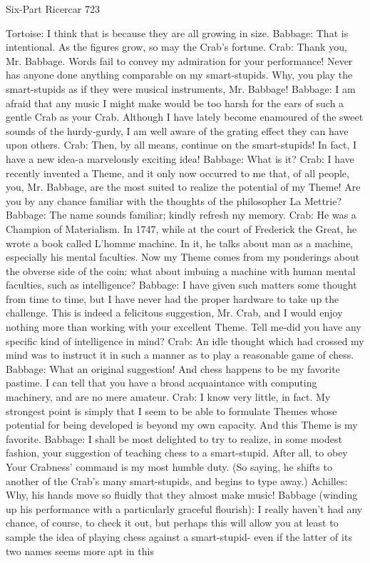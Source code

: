 Six-Part Ricercar                                                                       723

Tortoise: I think that is because they are all growing in size.
Babbage: That is intentional. As the figures grow, so may the Crab's fortune.
Crab: Thank you, Mr. Babbage. Words fail to convey my admiration for your
  performance! Never has anyone done anything comparable on my smart-stupids. Why,
  you play the smart-stupids as if they were musical instruments, Mr. Babbage!
Babbage: I am afraid that any music I might make would be too harsh for the ears of such
  a gentle Crab as your Crab. Although I have lately become enamoured of the sweet
  sounds of the hurdy-gurdy, I am well aware of the grating effect they can have upon
  others.
Crab: Then, by all means, continue on the smart-stupids! In fact, I have a new idea-a
  marvelously exciting idea!
Babbage: What is it?
Crab: I have recently invented a Theme, and it only now occurred to me that, of all
  people, you, Mr. Babbage, are the most suited to realize the potential of my Theme!
  Are you by any chance familiar with the thoughts of the philosopher La Mettrie?
Babbage: The name sounds familiar; kindly refresh my memory.
Crab: He was a Champion of Materialism. In 1747, while at the court of Frederick the
  Great, he wrote a book called L'homme machine. In it, he talks about man as a
  machine, especially his mental faculties. Now my Theme comes from my ponderings
  about the obverse side of the coin: what about imbuing a machine with human mental
  faculties, such as intelligence?
Babbage: I have given such matters some thought from time to time, but I have never had
  the proper hardware to take up the challenge. This is indeed a felicitous suggestion,
  Mr. Crab, and I would enjoy nothing more than working with your excellent Theme.
  Tell me-did you have any specific kind of intelligence in mind?
Crab: An idle thought which had crossed my mind was to instruct it in such a manner as
  to play a reasonable game of chess.
Babbage: What an original suggestion! And chess happens to be my favorite pastime. I
  can tell that you have a broad acquaintance with computing machinery, and are no
  mere amateur.
Crab: I know very little, in fact. My strongest point is simply that I seem to be able to
  formulate Themes whose potential for being developed is beyond my own capacity.
  And this Theme is my favorite.
Babbage: I shall be most delighted to try to realize, in some modest fashion, your
  suggestion of teaching chess to a smart-stupid. After all, to obey Your Crabness'
  command is my most humble duty. (So saying, he shifts to another of the Crab's many
  smart-stupids, and begins to type away.)
Achilles: Why, his hands move so fluidly that they almost make music!
Babbage (winding up his performance with a particularly graceful flourish): I really
  haven't had any chance, of course, to check it out, but perhaps this will allow you at
  least to sample the idea of playing chess against a smart-stupid- even if the latter of its
  two names seems more apt in this




